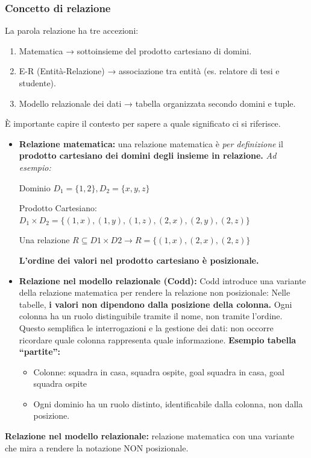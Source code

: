 \documentclass{article}
\begin{document}
\subsubsection{Concetto di relazione}
La parola relazione ha tre accezioni: \begin{enumerate}
    \item Matematica → sottoinsieme del prodotto cartesiano di domini.
    \item E-R (Entità-Relazione) → associazione tra entità (es. relatore di tesi e studente).
    \item Modello relazionale dei dati → tabella organizzata secondo domini e tuple.
\end{enumerate}
È importante capire il contesto per sapere a quale significato ci si riferisce.
\begin{itemize}
     
\item \textbf{Relazione matematica: } una relazione matematica è \emph{per definizione} il \textbf{prodotto cartesiano dei domini degli insieme in relazione.} \textit{Ad esempio:} 

Dominio $D_1 = \{1,2\}, D_2 = \{x,y,z\}$

Prodotto Cartesiano: $D_1 \times D_2 = \{ (1,x), (1,y), (1,z), (2,x),(2,y),(2,z)\}$ 

Una relazione $R \subseteq D1 \times D2 \to R = \{(1,x), (2,x), (2,z)\}$

\textbf{L'ordine dei valori nel prodotto cartesiano è posizionale.} 
\item \textbf{Relazione nel modello relazionale (Codd):} Codd introduce una variante della relazione matematica per rendere la relazione non posizionale: Nelle tabelle, \textbf{i valori non dipendono dalla posizione della colonna.} Ogni colonna ha un ruolo distinguibile tramite il nome, non tramite l’ordine. Questo semplifica le interrogazioni e la gestione dei dati: non occorre ricordare quale colonna rappresenta quale informazione. \textbf{Esempio tabella “partite”:} \begin{itemize}
    \item Colonne: squadra in casa, squadra ospite, goal squadra in casa, goal squadra ospite
\item Ogni dominio ha un ruolo distinto, identificabile dalla colonna, non dalla posizione.
\end{itemize}


\end{itemize}


\textbf{Relazione nel modello relazionale:} relazione matematica con una variante che mira a rendere la notazione NON posizionale. 
\end{document}
